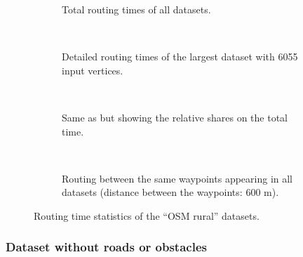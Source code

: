 			\clearpage
			\begin{figure}[h!]
				\begin{figcenter}
					\begin{subfigure}[t]{\textwidth}
						\begin{figcenter}
							
						\end{figcenter}
						\caption{Total routing times of all datasets.}
					\end{subfigure}
					\\[3ex]
					\begin{subfigure}[t]{\textwidth}
						\begin{figcenter}
							
						\end{figcenter}
						\caption{Detailed routing times of the largest dataset with 6055 input vertices.}
						\label{fig:eval-rural-routing-details-b}
					\end{subfigure}
					\\[3ex]
					\begin{subfigure}[t]{\textwidth}
						\begin{figcenter}
							
						\end{figcenter}
						\caption{Same as  but showing the relative shares on the total time.}
					\end{subfigure}
					\\[3ex]
					\begin{subfigure}[t]{\textwidth}
						\begin{figcenter}
							
						\end{figcenter}
						\caption{Routing between the same waypoints appearing in all datasets (distance between the waypoints: 600 m).}
					\end{subfigure}
				\end{figcenter}
				\caption{Routing time statistics of the \enquote{OSM rural} datasets.}
				\label{fig:eval-rural-routing-details}
			\end{figure}
			
		\subsubsection{Dataset without roads or obstacles}
		\label{subsubsec:dataset-without-roads-obstacles}
		
